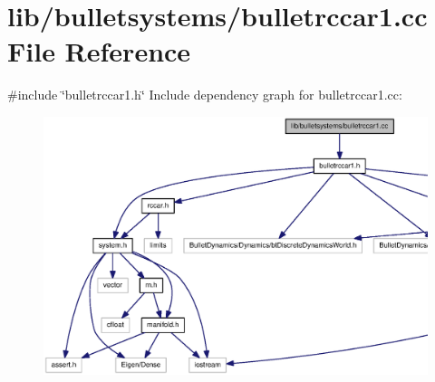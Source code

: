 \section{lib/bulletsystems/bulletrccar1.cc \-File \-Reference}
\label{bulletrccar1_8cc}
{\ttfamily \#include \char`\"{}bulletrccar1.\-h\char`\"{}}\*
\-Include dependency graph for bulletrccar1.\-cc\-:
\nopagebreak
\begin{figure}[H]
\begin{center}
\leavevmode
\includegraphics[width=350pt]{bulletrccar1_8cc__incl}
\end{center}
\end{figure}
